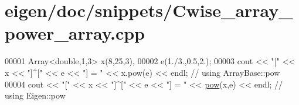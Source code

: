 \hypertarget{eigen_2doc_2snippets_2_cwise__array__power__array_8cpp_source}{}\section{eigen/doc/snippets/\+Cwise\+\_\+array\+\_\+power\+\_\+array.cpp}
\label{eigen_2doc_2snippets_2_cwise__array__power__array_8cpp_source}

\begin{DoxyCode}
00001 Array<double,1,3> x(8,25,3),
00002                   e(1./3.,0.5,2.);
00003 cout << \textcolor{stringliteral}{"["} << x << \textcolor{stringliteral}{"]^["} << e << \textcolor{stringliteral}{"] = "} << x.pow(e) << endl; \textcolor{comment}{// using ArrayBase::pow}
00004 cout << \textcolor{stringliteral}{"["} << x << \textcolor{stringliteral}{"]^["} << e << \textcolor{stringliteral}{"] = "} << \hyperlink{group___core___module_ab6dc101d82e8228a19a8840e3a29c1c9}{pow}(x,e) << endl; \textcolor{comment}{// using Eigen::pow}
\end{DoxyCode}
